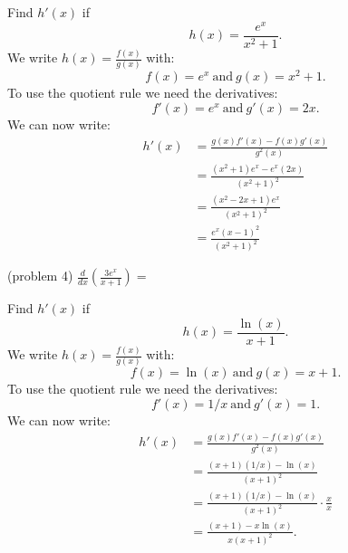 \documentclass{ximera}
\begin{document}
\begin{example}[example 4]
Find $h'(x)$ if
\[
h(x) = \frac{e^x}{x^2 + 1}.
\]
We write $\displaystyle{h(x) = \frac{f(x)}{g(x)}}$ 
with:
\[f(x) =e^x \ \text{and} \  g(x)= x^2 + 1.\]
To use the quotient rule we need the derivatives:
\[f'(x) = e^x \ \text{and} \  g'(x) =2x.\] 
We can now write: 
\begin{align*}
h'(x) &= \frac{g(x)f'(x) - f(x)g'(x)}{g^2(x)}\\
&= \frac{(x^2+1)e^x - e^x(2x)}{(x^2 + 1)^2} \\
&= \frac{(x^2 - 2x +1)e^x}{(x^2 + 1)^2} \\
&= \frac{e^x(x-1)^2}{(x^2 + 1)^2} 
\end{align*}
\end{example}



\begin{center}
\begin{foldable}
\end{foldable}
\end{center}



\begin{problem}(problem 4)
  $\displaystyle{\frac{d}{dx} \left(\frac{3e^x}{x + 1}\right)=}$\\
  
  \begin{multipleChoice}
  \end{multipleChoice}
\end{problem}



\begin{example}[example 5]
Find $h'(x)$ if
\[
h(x) = \frac{\ln(x)}{x+1}.
\]
We write $\displaystyle{h(x) = \frac{f(x)}{g(x)}}$ 
with:
\[f(x) =\ln(x) \  \text{and} \  g(x)= x+1.\]
To use the quotient rule we need the derivatives:
\[f'(x) =1/x  \ \text{and} \  g'(x) = 1.\]
We can now write: 
\begin{align*}
h'(x) &= \frac{g(x)f'(x) - f(x)g'(x)}{g^2(x)}\\
&= \frac{(x+1)(1/x) - \ln(x)}{(x+1)^2}\\
&= \frac{(x+1)(1/x) - \ln(x)}{(x+1)^2}\cdot \frac{x}{x}\\
&= \frac{(x+1) - x\ln(x)}{x(x+1)^2}.
\end{align*}
\end{example}
\end{document}
